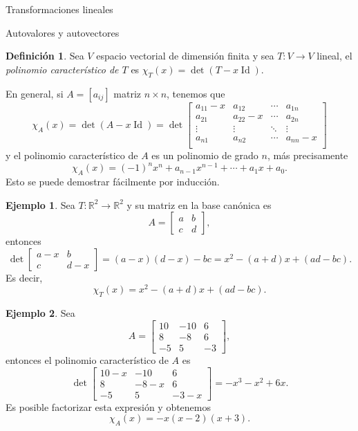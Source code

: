 \documentclass[a4paper,12pt,twoside,spanish,reqno]{amsbook}
\theoremstyle{definition}
\newtheorem{definicion}{Definici\'on}[section]
\newtheorem{ejemplo}{Ejemplo}[section]
\theoremstyle{remark}
\newcommand{\Id}{\operatorname{Id}}
\newcommand{\R}{\mathbb R}
\begin{document}
\begin{chapter}{Transformaciones lineales}
\begin{section}{Autovalores y autovectores}
\begin{definicion}
			Sea $V$ espacio vectorial de dimensión finita y sea $T: V \to V$ lineal, el  \textit{polinomio característico de $T$} es $\chi_T(x) = \det(T- x \Id)$.
		\end{definicion}
	
			
		En general,  si $A = [a_{ij}]$ matriz $n \times n$, tenemos que
		\begin{equation}
		\chi_A(x) = \det(A- x\Id) = \det
		\begin{bmatrix}
		a_{11}-x&a_{12}&\cdots&a_{1n}\\
		a_{21}&a_{22}-x&\cdots&a_{2n}\\
		\vdots&\vdots&\ddots&\vdots\\
		a_{n1}&a_{n2}&\cdots&a_{nn}-x\\
		\end{bmatrix}
		\end{equation} 
		y el polinomio característico de $A$ es un polinomio  de grado $n$,  más precisamente  
		$$
		\chi_A(x) =(-1)^nx^n + a_{n-1}x^{n-1}+ \cdots + a_1x + a_0.
		$$ 
		Esto se puede demostrar fácilmente por inducción. 
		
		\begin{ejemplo}
			Sea $T: \R^2 \to \R^2$ y su matriz en la base canónica es
			\begin{equation*}
				A = \begin{bmatrix}
					a&b\\c&d
				\end{bmatrix},
			\end{equation*}
		entonces
		\begin{equation*}
				 \det \begin{bmatrix}
				a-x & b \\ c &d-x
				\end{bmatrix} = 
				(a-x)(d-x) - bc = x^2 -(a+d)x + (ad -bc).
		\end{equation*}
		Es decir,
		$$
		\chi_T(x) = x^2 -(a+d)x + (ad -bc).
		$$ 
		\end{ejemplo}

	
	
		
		\begin{ejemplo} \label{ej-autovectores}
			Sea
			$$ 
			A=\begin{bmatrix}10&-10&6\\8& -8& 6\\-5& 5& -3\end{bmatrix},
			$$
			entonces el  polinomio característico de $A$ es
			$$
			\det \begin{bmatrix}10-x&-10&6\\8& -8-x& 6\\-5& 5& -3-x\end{bmatrix} = -x^3  - x^2 + 6 x .
			$$
			Es posible factorizar esta expresión y obtenemos
			$$
			\chi_A(x) = -x (x-2)(x+3).
			$$
		\end{ejemplo}
		

\end{section}
\end{chapter}
\end{document}
